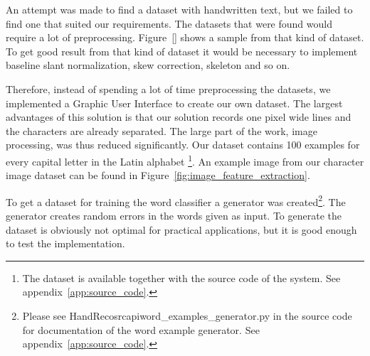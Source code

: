 
An attempt was made to find a dataset with handwritten text, but we failed to find one that suited our requirements.
The datasets that were found would require a lot of preprocessing. 
Figure~\ref{} shows a sample from that kind of dataset.
To get good result from that kind of dataset it would be necessary to implement baseline slant normalization, skew correction, skeleton and so on.

Therefore, instead of spending a lot of time preprocessing the datasets, we implemented a Graphic User Interface to create our own dataset.
The largest advantages of this solution is that our solution records one pixel wide lines and the characters are already separated. 
The large part of the work, image processing, was thus reduced significantly.
Our dataset contains 100 examples for every capital letter in the Latin alphabet
\footnote{The dataset is available together with the source code of the system. See appendix~\ref{app:source_code}.}.
An example image from our character image dataset can be found in Figure~\ref{fig:image_feature_extraction}.

To get a dataset for training the word classifier a generator was created\footnote{Please see HandReco\/src\/api\/word\_examples\_generator.py in the source code for documentation of the word example generator. See appendix~\ref{app:source_code}.}.
The generator creates random errors in the words given as input.
To generate the dataset is obviously not optimal for practical applications, but it is good enough to test the implementation.


